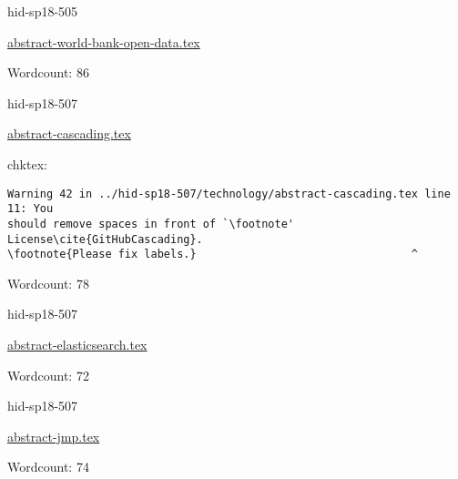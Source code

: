 \begin{IU}

hid-sp18-505

\href{https://github.com/cloudmesh-community/hid-sp18-505/blob/master//technology/abstract-world-bank-open-data.tex}{abstract-world-bank-open-data.tex}

 

Wordcount: 86

\end{IU}



\begin{IU}

hid-sp18-507

\href{https://github.com/cloudmesh-community/hid-sp18-507/blob/master//technology/abstract-cascading.tex}{abstract-cascading.tex}

 
chktex:
\begin{tiny}
\begin{verbatim}
Warning 42 in ../hid-sp18-507/technology/abstract-cascading.tex line 11: You
should remove spaces in front of `\footnote' License\cite{GitHubCascading}.
\footnote{Please fix labels.}                                 ^
\end{verbatim}
\end{tiny}

Wordcount: 78

\end{IU}



\begin{IU}

hid-sp18-507

\href{https://github.com/cloudmesh-community/hid-sp18-507/blob/master//technology/abstract-elasticsearch.tex}{abstract-elasticsearch.tex}

 

Wordcount: 72

\end{IU}



\begin{IU}

hid-sp18-507

\href{https://github.com/cloudmesh-community/hid-sp18-507/blob/master//technology/abstract-jmp.tex}{abstract-jmp.tex}

 

Wordcount: 74

\end{IU}

